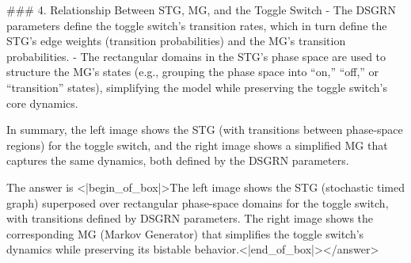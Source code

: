 ### 4. Relationship Between STG, MG, and the Toggle Switch  
- The DSGRN parameters define the toggle switch’s transition rates, which in turn define the STG’s edge weights (transition probabilities) and the MG’s transition probabilities.  
- The rectangular domains in the STG’s phase space are used to structure the MG’s states (e.g., grouping the phase space into “on,” “off,” or “transition” states), simplifying the model while preserving the toggle switch’s core dynamics.  


In summary, the left image shows the STG (with transitions between phase-space regions) for the toggle switch, and the right image shows a simplified MG that captures the same dynamics, both defined by the DSGRN parameters.  

The answer is <|begin_of_box|>The left image shows the STG (stochastic timed graph) superposed over rectangular phase-space domains for the toggle switch, with transitions defined by DSGRN parameters. The right image shows the corresponding MG (Markov Generator) that simplifies the toggle switch’s dynamics while preserving its bistable behavior.<|end_of_box|></answer>